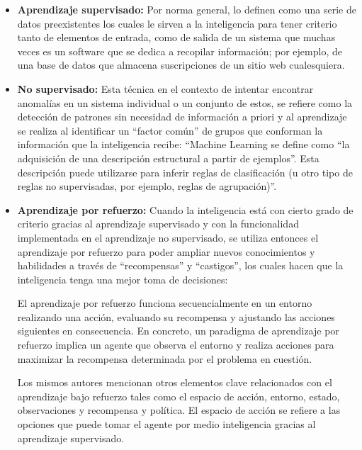 \begin{itemize}
  \item \textbf{Aprendizaje supervisado:}
    Por norma general, \textcite{Janiesch2021} lo definen como una serie de datos
    preexistentes los cuales le sirven a la inteligencia para tener criterio tanto
    de elementos de entrada, como de salida de un sistema que muchas veces es un
    software que se dedica a recopilar información; por ejemplo, de una base de
    datos que almacena suscripciones de un sitio web cualesquiera.

  \item \textbf{No supervisado:}
    Esta técnica en el contexto de intentar encontrar anomalías en un sistema
    individual o un conjunto de estos, se refiere como la detección de patrones
    sin necesidad de información a priori y al aprendizaje se realiza al
    identificar un ``factor común'' de grupos que conforman la información que la
    inteligencia recibe: ``Machine Learning se define como ``la adquisición de una
    descripción estructural a partir de ejemplos''. Esta descripción puede
    utilizarse para inferir reglas de clasificación (u otro tipo de reglas no
    supervisadas, por ejemplo, reglas de agrupación)''.
    \parencite[Witten et al., 2011, como se cita en][]{Singh2022}

  \item \textbf{Aprendizaje por refuerzo:}
    Cuando la inteligencia está con cierto grado de criterio gracias al aprendizaje
    supervisado y con la funcionalidad implementada en el aprendizaje no
    supervisado, se utiliza entonces el aprendizaje por refuerzo para poder ampliar
    nuevos conocimientos y habilidades a través de ``recompensas'' y ``castigos'',
    los cuales hacen que la inteligencia tenga una mejor toma de decisiones:

    \begin{displayquote}
      El aprendizaje por refuerzo funciona secuencialmente en un entorno
      realizando una acción, evaluando su recompensa y ajustando las acciones
      siguientes en consecuencia. En concreto, un paradigma de aprendizaje por
      refuerzo implica un agente que observa el entorno y realiza acciones para
      maximizar la recompensa determinada por el problema en cuestión.
      \parencite[Richard S Sutton y Andrew G Barto., 2018, como se cita en][]
      {Chen2023}
    \end{displayquote}

    Los mismos autores mencionan otros elementos clave relacionados con el
    aprendizaje bajo refuerzo tales como el espacio de acción, entorno, estado,
    observaciones y recompensa y política. El espacio de acción se refiere a las
    opciones que puede tomar el agente por medio inteligencia gracias al
    aprendizaje supervisado. \parencite{Janiesch2021}


\end{itemize}
